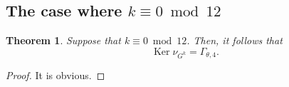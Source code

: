 \documentclass[12pt]{article}
\theoremstyle{definition}
\newtheorem{theorem}{Theorem}
\numberwithin{equation}{section}
\numberwithin{theorem}{section}
\newcommand{\Ker}{\operatorname{Ker}}
\begin{document}
\subsection{The case where $k\equiv 0 \bmod{12}$}


\begin{theorem}
{\it
Suppose that 
$k\equiv 0 \bmod{12}$. 
Then, it follows that 
\begin{equation*}
\Ker \nu_{G^{k}}
=\Gamma_{\theta,4}.
\end{equation*}
}
\end{theorem}


\begin{proof}
It is obvious. 
\end{proof}
\end{document}

